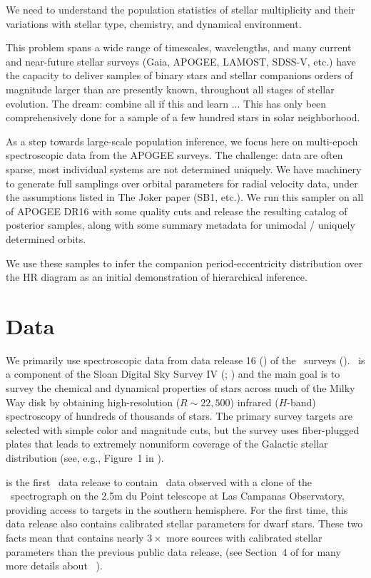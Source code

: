 \documentclass[modern]{aastex62}
\begin{document}
We need to understand the population statistics of stellar multiplicity and their variations with stellar type, chemistry, and dynamical environment.

This problem spans a wide range of timescales, wavelengths, and many current and near-future stellar surveys (Gaia, APOGEE, LAMOST, SDSS-V, etc.) have the capacity to deliver samples of binary stars and stellar companions orders of magnitude larger than are presently known, throughout all stages of stellar evolution.
The dream: combine all if this and learn ...
This has only been comprehensively done for a sample of a few hundred stars in solar neighborhood.

As a step towards large-scale population inference, we focus here on multi-epoch spectroscopic data from the APOGEE surveys.
The challenge: data are often sparse, most individual systems are not determined uniquely.
We have machinery to generate full samplings over orbital parameters for radial velocity data, under the assumptions listed in The Joker paper (SB1, etc.).
We run this sampler on all of APOGEE DR16 with some quality cuts and release the resulting catalog of posterior samples, along with some summary metadata for unimodal / uniquely determined orbits.

We use these samples to infer the companion period-eccentricity distribution over the HR diagram as an initial demonstration of hierarchical inference.


\section{Data} \label{sec:data}

We primarily use spectroscopic data from data release 16 () of the
\apogee\ surveys (\citealt{Majewski:2017, Abolfathi:2017, DR16}).
\apogee\ is a component of the Sloan Digital Sky Survey IV (\sdssiv;
\citealt{Gunn:2006, Blanton:2017}) and the main goal is to survey the chemical
and dynamical properties of stars across much of the Milky Way disk by obtaining
high-resolution ($R \sim 22,500$) infrared ($H$-band) spectroscopy of hundreds
of thousands of stars.
The primary survey targets are selected with simple color and magnitude cuts,
but the survey uses fiber-plugged plates that leads to extremely nonuniform
coverage of the Galactic stellar distribution (see, e.g., Figure~1 in
\citealt{DR16}).

 is the first \sdss\ data release to contain \apogee\ data observed with
a clone of the \apogee\ spectrograph on the 2.5m du Point telescope at Las
Campanas Observatory, providing access to targets in the southern hemisphere.
For the first time, this data release also contains calibrated stellar
parameters for dwarf stars.
These two facts mean that  contains nearly $3\times$ more sources with
calibrated stellar parameters than the previous public data release, 
(see Section~4 of \citealt{DR16} for many more details about \apogee\ ).
\end{document}

